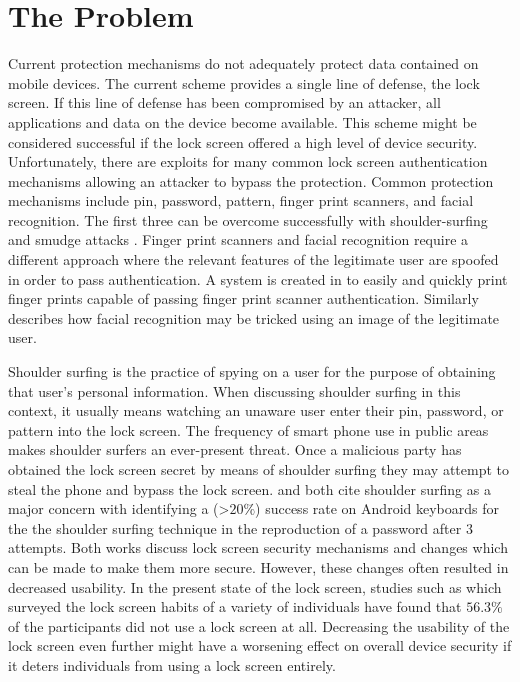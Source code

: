 \section{The Problem}
\label{the_problem}
Current protection mechanisms do not adequately protect
data contained on mobile devices.
The current scheme provides a single line of defense,
the lock screen.
If this line of defense has been compromised
by an attacker,
all applications and data on the device become available.
%
This scheme might be considered successful 
if the lock screen offered a high level of device security.
Unfortunately, there are exploits for many common lock screen 
authentication mechanisms 
allowing an attacker to bypass the protection.
%
Common protection mechanisms include
pin, password, pattern, finger print scanners, and facial recognition.
%
The first three can be overcome successfully with 
shoulder-surfing \cite{schaub2012password} and smudge attacks \cite{aviv2010smudge}.
Finger print scanners and facial recognition require a different approach
where the relevant features of the legitimate user are spoofed
in order to pass authentication.
%
A system is created in \cite{cao2016hacking} 
to easily and quickly print finger prints
capable of passing finger print scanner authentication.
%
Similarly \cite{de2013can} describes how
facial recognition may be tricked using an image of the legitimate user.

%
Shoulder surfing is the practice of spying
on a user for the purpose of
obtaining that user's personal information.
%
When discussing shoulder surfing in this context,
it usually means watching an unaware user 
enter their pin, password, or pattern into
the lock screen.
%
The frequency of smart phone use in public areas
makes shoulder surfers an ever-present threat.
%
Once a malicious party has obtained
the lock screen secret by means of shoulder surfing
they may attempt to steal the phone and bypass the lock screen.
%
\cite{schaub2012password} and \cite{hafiz2008towards} both
cite shoulder surfing as a major concern with 
\cite{schaub2012password} identifying
a (\textgreater$20\%$) success rate
on Android keyboards
for the the shoulder surfing technique
in the reproduction of a password after $3$ attempts.
%
Both works discuss lock screen security mechanisms
and changes which can be made to make them more secure.
However, these changes often resulted in 
decreased usability.
%
In the present state of the lock screen,
studies such as \cite{harbach2014sa} 
which surveyed the lock screen habits of a variety of individuals
have found that
$56.3\%$ of the participants
did not use a lock screen at all.
%
Decreasing the usability of the lock screen even further might
have a worsening effect on overall device security if
it deters individuals from using a lock screen entirely. 


